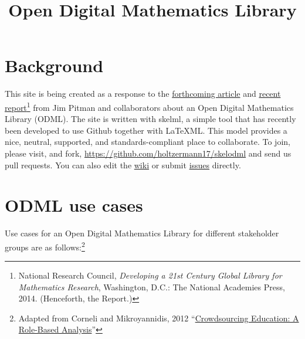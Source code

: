 \documentclass{article}
\begin{document}
\title{Open Digital Mathematics Library}

\maketitle

\section{Background}

This site is being created as a response to the  \href{http://www.mathunion.org/fileadmin/CEIC/planning_wdml.pdf}{forthcoming article} and
 \href{http://arxiv.org/abs/1404.1905}{recent report}\footnote{National Research Council, \emph{Developing a 21st Century Global Library for Mathematics Research}, Washington, D.C.: The National Academies Press, 2014.  (Henceforth, the Report.)} from Jim Pitman and collaborators about an Open Digital Mathematics Library (ODML).
%
The site is written with skelml, a simple tool that has recently been developed to use Github together with \LaTeX ML.  This model provides a nice, neutral, supported, and standards-compliant place to collaborate.  To join, please visit, and fork, \url{https://github.com/holtzermann17/skelodml} and send us pull requests.  You can also edit the \href{https://github.com/holtzermann17/skelodml/wiki}{wiki} or
submit \href{https://github.com/holtzermann17/skelodml/issues}{issues} directly.

\section{ODML use cases}

Use cases for an Open Digital Mathematics Library for different stakeholder groups are as follows:\footnote{Adapted from Corneli and Mikroyannidis, 2012 ``\href{http://oro.open.ac.uk/33221/1/corneli_chap_okada_book.pdf}{Crowdsourcing Education: A Role-Based Analysis}''}
\end{document}
